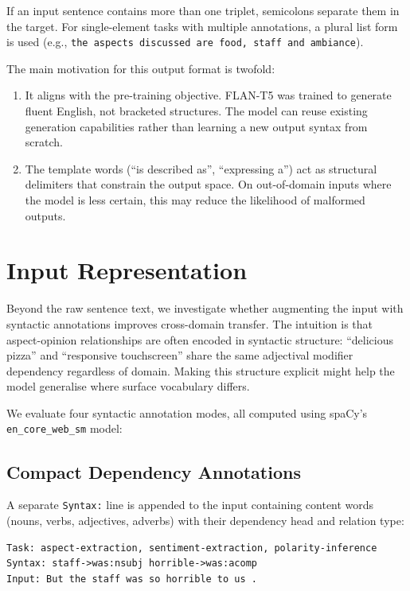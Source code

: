 \documentclass[12pt,a4paper]{report}
\begin{document}
If an input sentence contains more than one triplet, semicolons separate them in the target. For single-element tasks with multiple annotations, a plural list form is used (e.g., \texttt{the aspects discussed are food, staff and ambiance}).

The main motivation for this output format is twofold:
\begin{enumerate}
    \item It aligns with the pre-training objective. FLAN-T5 was trained to generate fluent English, not bracketed structures. The model can reuse existing generation capabilities rather than learning a new output syntax from scratch.
    \item The template words (``is described as'', ``expressing a'') act as structural delimiters that constrain the output space. On out-of-domain inputs where the model is less certain, this may reduce the likelihood of malformed outputs.
\end{enumerate}


\section{Input Representation}\label{sec:syntax}

Beyond the raw sentence text, we investigate whether augmenting the input with syntactic annotations improves cross-domain transfer. The intuition is that aspect-opinion relationships are often encoded in syntactic structure: ``delicious pizza'' and ``responsive touchscreen'' share the same adjectival modifier dependency regardless of domain. Making this structure explicit might help the model generalise where surface vocabulary differs.

We evaluate four syntactic annotation modes, all computed using spaCy's \texttt{en\_core\_web\_sm} model:

\subsection{Compact Dependency Annotations}

A separate \texttt{Syntax:} line is appended to the input containing content words (nouns, verbs, adjectives, adverbs) with their dependency head and relation type:

\begin{lstlisting}
Task: aspect-extraction, sentiment-extraction, polarity-inference
Syntax: staff->was:nsubj horrible->was:acomp
Input: But the staff was so horrible to us .
\end{lstlisting}
\end{document}
